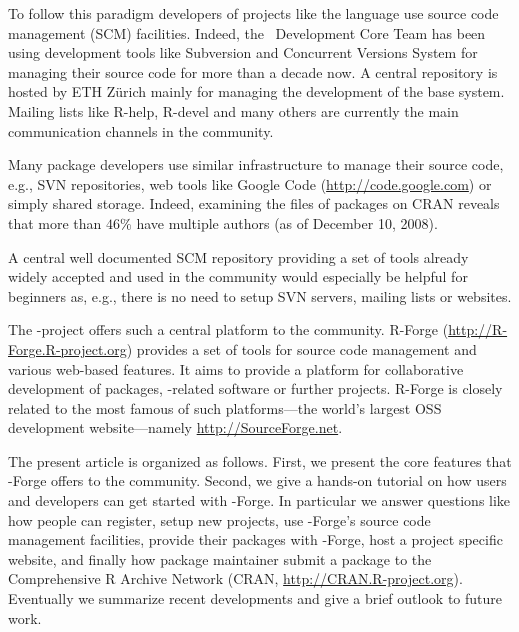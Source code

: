 

To follow this paradigm developers of projects like the
language \R{} use source code management (SCM) facilities. Indeed, the
\R{}~Development Core Team has been using 
development tools like Subversion \citep[SVN,
see][]{forge:Pilato+Collins-Sussman+Fitzpatrick:2004} and Concurrent
Versions System \citep[CVS, see][]{forge:Cederqvist:2006} 
for managing their source code for more than a decade now.  
A central repository is hosted by ETH Z\"urich mainly for
managing the development of the base \R{} system. Mailing lists like
R-help, R-devel and many others are currently the main communication
channels in  the \R{} community.

Many \R{} package developers use similar infrastructure to manage their
source code, e.g., SVN repositories, web tools like Google Code
(\url{http://code.google.com}) or simply shared storage. Indeed,
examining the  files of packages on CRAN 
reveals that more than $46\%$ have multiple 
authors (as of December 10, 2008). 

A central well documented SCM repository providing a set of tools already
widely accepted and used in the \R{} community would especially be
helpful for beginners as, e.g., there is no need to setup
SVN servers, mailing lists or websites. 

The \R{}-project offers such a central platform to the \R{}
community. R-Forge (\url{http://R-Forge.R-project.org}) provides a set
of tools for source code management and various web-based
features. It aims to provide a platform for collaborative development of
\R{} packages, \R{}-related software or further projects. R-Forge is
closely related to the most famous of such platforms---the 
world's largest OSS development website---namely
\url{http://SourceForge.net}.

The present article is organized as follows. First, we present the core
features that \R{}-Forge offers to the \R{} community. Second, we
give a hands-on tutorial on how users and developers can get started with 
\R{}-Forge. In particular we answer questions like how people
can register, setup new projects, use \R{}-Forge's source code
management facilities, provide their  
packages with \R{}-Forge, host a project specific website, and
finally how package maintainer submit a package to the Comprehensive R
Archive Network (CRAN, \url{http://CRAN.R-project.org}).
Eventually we summarize recent developments and give a brief outlook
to future work.


